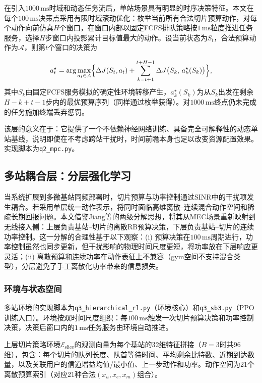 \documentclass[UTF8,a4paper,12pt,fontset=fandol]{ctexart}
\begin{document}
在引入$1000\,\mathrm{ms}$时域和动态任务流后，单站场景具有明显的时序决策特征。本文在每个$100\,\mathrm{ms}$决策点采用有限时域滚动优化：枚举当前所有合法切片预算动作，对每个动作向前仿真$H$个窗口，在窗口内部以固定FCFS排队策略按$1\,\mathrm{ms}$粒度推进任务服务，选择$H$步窗口内投影累计目标值最大的动作。设当前状态为$S_t$，合法预算动作为$\mathcal{A}$，则第$t$个窗口的决策为

\begin{equation}
  a_t^\star = \arg\max_{a_t\in\mathcal{A}} \Bigl\{
    \Delta J(S_t,a_t) + \sum_{k=t+1}^{t+H-1} \Delta J\bigl(S_k,\,a_k^\star(S_k)\bigr)
  \Bigr\},
\end{equation}
其中$S_{k}$由固定FCFS服务模拟的确定性环境转移产生，$a_k^\star(S_k)$为从$S_k$出发在剩余$H-k+t-1$步内的最优预算序列（同样通过枚举获得）。对$1000\,\mathrm{ms}$终点仍未完成的任务施加终端丢弃惩罚。

该层的意义在于：它提供了一个不依赖神经网络训练、具备完全可解释性的动态单站基线，说明即使在不考虑跨站干扰时，时间前瞻本身也足以改变资源配置效果。实现脚本为\texttt{q2\_mpc.py}。

\subsection{多站耦合层：分层强化学习}

当系统扩展到多微基站同频部署时，切片预算与功率控制通过SINR中的干扰项发生耦合。若采用单层统一动作表示，将同时面临高维离散--连续混合动作空间和稀疏长期回报问题。本文借鉴Jiang等\cite{jiang2024rlsa}的两级分解思想，将其从MEC场景重新映射到无线接入侧：上层负责基站--切片的离散RB预算决策，下层负责基站--切片的连续功率控制。这一分解的合理性基于以下观察：(i) 预算决策在$100\,\mathrm{ms}$周期进行，功率控制虽然也同步更新，但干扰影响的物理时间尺度更短，将功率放在下层响应更灵活；(ii) 离散预算和连续功率在动作表征上不兼容（gym空间不支持混合类型），分层避免了手工离散化功率带来的信息损失。

\subsubsection{环境与状态空间}

多站环境的实现脚本为\texttt{q3\_hierarchical\_rl.py}（环境核心）和\texttt{q3\_sb3.py}（PPO训练入口）。环境按双时间尺度组织：每$100\,\mathrm{ms}$触发一次切片预算决策和功率控制决策，决策后窗口内的$1\,\mathrm{ms}$任务服务由环境自动推进。

上层切片策略环境$\mathcal{E}_{\text{slice}}$的观测向量为每个基站的32维特征拼接（$B=3$时共96维），包含：每个切片的队列长度、队首等待时间、平均剩余比特数、近期到达数量，以及关联用户的信道增益均值/最小值、上一步动作和功率。动作空间为21个离散预算索引（对应21种合法$(x_u,x_e,x_m)$组合）。
\end{document}
